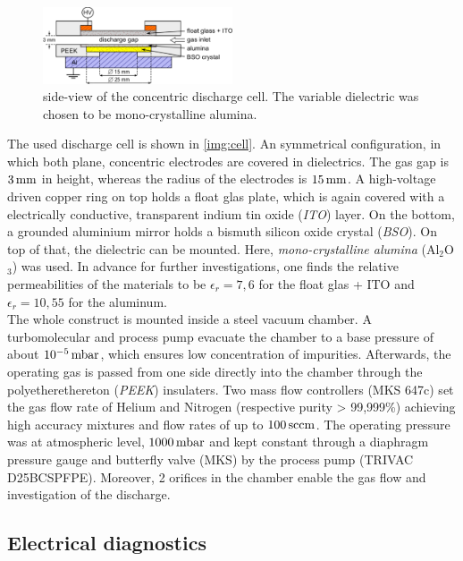 \documentclass[a4paper,10pt]{article}
\newcommand{\tenpo}[1]{ 10^{#1}}
\newcommand{\tilt}[1]{\textit{#1}}
\begin{document}
				\begin{figure}
					\centering
					\includegraphics[width=0.5\textwidth]{figures/setup/discharge_cell.pdf}
					\caption{side-view of the concentric discharge cell. The variable dielectric was chosen to be mono-crystalline alumina.}
					\label{img:cell}
				\end{figure}
		
			The used discharge cell is shown in \autoref{img:cell}. An symmetrical configuration, in which both plane, concentric electrodes are covered in dielectrics. The gas gap is $\unit[3]{mm}$ in height, whereas the radius of the electrodes is $\unit[15]{mm}$. A high-voltage driven copper ring on top holds a float glas plate, which is again covered with a electrically conductive, transparent indium tin oxide  (\tilt{ITO}) layer. On the bottom, a grounded aluminium mirror holds a bismuth silicon oxide crystal (\tilt{BSO}). On top of that, the dielectric can be mounted. Here, \tilt{mono-crystalline alumina} (Al$_2$O$_3$) was used. In advance for further investigations, one finds the relative permeabilities of the materials to be $\epsilon_r=7,6$ for the float glas + ITO and $\epsilon_r=10,55$ for the aluminum.\\
			The whole construct is mounted inside a steel vacuum chamber. A turbomolecular and process pump evacuate the chamber to a base pressure of about $\unit[\tenpo{-5}]{mbar}$, which ensures low concentration of impurities. Afterwards, the operating gas is passed from one side directly into the chamber through the polyetherethereton (\tilt{PEEK}) insulaters. Two mass flow controllers (MKS 647c) set the gas flow rate of Helium and Nitrogen (respective purity > 99,999\%) achieving high accuracy mixtures and flow rates of up to $\unit[100]{sccm}$. The operating pressure was at atmospheric level, $\unit[1000]{mbar}$ and kept constant through a diaphragm pressure gauge and butterfly valve (MKS) by the process pump (TRIVAC D25BCSPFPE). Moreover, 2 orifices in the chamber enable the gas flow and investigation of the discharge.\\
			

		\subsection{Electrical diagnostics}
		
\end{document}
